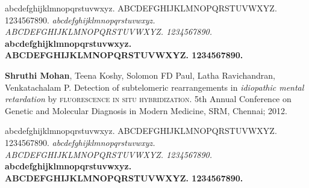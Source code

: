 abcdefghijklmnopqrstuvwxyz. ABCDEFGHIJKLMNOPQRSTUVWXYZ. 1234567890.
\textit{abcdefghijklmnopqrstuvwxyz. ABCDEFGHIJKLMNOPQRSTUVWXYZ. 1234567890.}
\textbf{abcdefghijklmnopqrstuvwxyz. ABCDEFGHIJKLMNOPQRSTUVWXYZ. 1234567890.}

\color{richblack}
\textbf{Shruthi Mohan}, Teena Koshy, Solomon FD Paul, Latha Ravichandran,
Venkatachalam P. Detection of subtelomeric rearrangements in \textit{idiopathic
  mental retardation} by \textsc{fluorescence in situ hybridization}. 5th Annual
Conference on Genetic and Molecular Diagnosis in Modern Medicine, SRM, Chennai;
2012.

abcdefghijklmnopqrstuvwxyz. ABCDEFGHIJKLMNOPQRSTUVWXYZ. 1234567890.
\textit{abcdefghijklmnopqrstuvwxyz. ABCDEFGHIJKLMNOPQRSTUVWXYZ. 1234567890.}
\textbf{abcdefghijklmnopqrstuvwxyz. ABCDEFGHIJKLMNOPQRSTUVWXYZ. 1234567890.}

